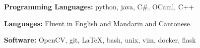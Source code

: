 \documentclass{resume}
\begin{document}
    \begin{smalldescription}
        \item \textbf{Programming Languages:} python, java, C\#, OCaml, C++
        \item \textbf{Languages: } Fluent in English and Mandarin and Cantonese
        \item \textbf{Software:} OpenCV, git, \LaTeX, bash, unix, vim, docker,
            flask
    \end{smalldescription}
\end{document}
